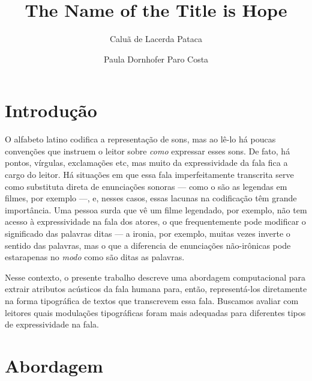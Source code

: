 \documentclass[11pt]{article}
\title{The Name of the Title is Hope}
\author{Caluã de Lacerda Pataca \and Paula Dornhofer Paro Costa}
\begin{document}
\hyphenation{}
\pagestyle{fancy}


  \section{Introdu\c{c}\~{a}o}
  \label{sec:introducao}

  O alfabeto latino codifica a representação de sons, mas ao lê-lo há poucas convenções que instruem o leitor sobre {\itshape como} expressar esses sons. De fato, há pontos, vírgulas, exclamações etc, mas muito da expressividade da fala fica a cargo do leitor. Há situações em que essa fala imperfeitamente transcrita serve como substituta direta de enunciações sonoras --- como o são as legendas em filmes, por exemplo ---, e, nesses casos, essas lacunas na codificação têm grande importância. Uma pessoa surda que vê um filme legendado, por exemplo, não tem acesso à expressividade na fala dos atores, o que frequentemente pode modificar o significado das palavras ditas --- a ironia, por exemplo, muitas vezes inverte o sentido das palavras, mas o que a diferencia de enunciações não-irônicas pode estarapenas no {\itshape modo} como são ditas as palavras.
  
  Nesse contexto, o presente trabalho descreve uma abordagem computacional para extrair atributos acústicos da fala humana para, então, representá-los diretamente na forma tipográfica de textos que transcrevem essa fala. Buscamos avaliar com leitores quais modulações tipográficas foram mais adequadas para diferentes tipos de expressividade na fala.

  \section{Abordagem}
  \label{sec:abordagem}
  
\end{document}
